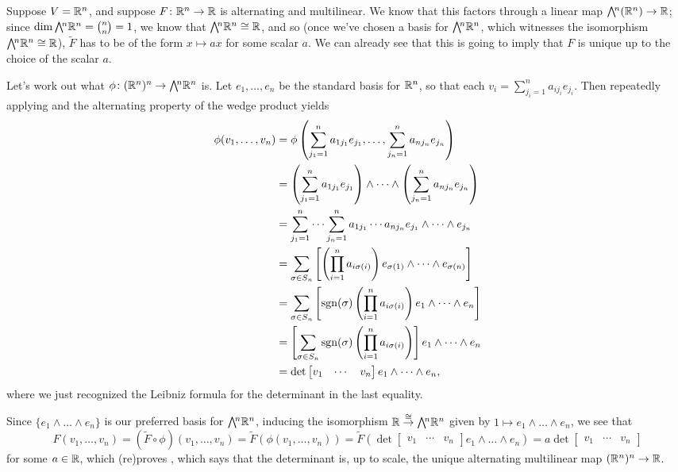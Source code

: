 \begin{example}
	Suppose $V = \mathbb{R}^n$, and suppose $F \colon\thinspace\! \mathbb{R}^n \to \mathbb{R}$ is alternating and multilinear. We know that this factors through a linear map $\ext{n}(\R^n) \to \R$; since $\dim \ext{n}\R^n = \binom{n}{n} = 1$, we know that $\ext{n}\R^n \cong \R$, and so (once we've chosen a basis for $\ext{n}\R^n$, which witnesses the isomorphism $\ext{n}\R^n \cong \R$), $\widetilde{F}$ has to be of the form $x \mapsto ax$ for some scalar $a$. We can already see that this is going to imply that $F$ is unique up to the choice of the scalar $a$.
	
	Let's work out what $\phi \from (\R^n)^n \to \ext{n}\R^n$ is. Let $e_1, \dots , e_n$ be the standard basis for $\mathbb{R}^n$, so that each $v_i = \sum_{j_i=1}^n a_{ij_i} e_{j_i}$. Then repeatedly applying  and the alternating property of the wedge product yields
	\begin{align*}
		\phi(v_1, \dots , v_n) & = \phi\left(\sum_{j_1=1}^n a_{1j_1}e_{j_1}, \dots , \sum_{j_n=1}^n a_{nj_n}e_{j_n}\right)  \\
		& = \left(\sum_{j_1=1}^n a_{1j_1}e_{j_1}\right) \wedge \dots \wedge \left(\sum_{j_n=1}^n a_{nj_n} e_{j_n}\right) \\
		& = \sum_{j_1=1}^n \dots \sum_{j_n=1}^n a_{1j_1} \cdots a_{n j_n} e_{j_1} \wedge \dots \wedge e_{j_n} \\
		& = \sum_{\sigma \in S_n} \left[ \left(\prod_{i=1}^n a_{i \sigma(i)}\right) e_{\sigma(1)} \wedge \dots \wedge e_{\sigma(n)}\right]  \\
		& = \sum_{\sigma \in S_n} \left[ \operatorname{sgn}(\sigma) \left(\prod_{i=1}^n a_{i\sigma(i)}\right) e_1 \wedge \dots \wedge e_n \right] \\
		& = \left[ \sum_{\sigma \in S_n} \operatorname{sgn}(\sigma) \left(\prod_{i=1}^n a_{i\sigma(i)}\right)\right] e_1 \wedge \dots \wedge e_n  \\
		& = \det \begin{bmatrix} v_1 & \cdots & v_n \end{bmatrix} e_1 \wedge \dots \wedge e_n,
	\end{align*}
	where we just recognized the Leibniz formula for the determinant in the last equality.
	
	Since $\{e_1 \wedge \dots \wedge e_n\}$ is our preferred basis for $\ext{n}\R^n$, inducing the isomorphism $\R \overset{\cong}{\to} \ext{n}\R^n$ given by $1 \mapsto e_1 \wedge \dots \wedge e_n$, we see that
	\[
		F(v_1, \dots , v_n) = (\widetilde{F} \circ \phi)(v_1, \dots , v_n) = \widetilde{F}(\phi(v_1, \dots , v_n)) = \widetilde{F}(\det \begin{bmatrix} v_1 & \cdots & v_n \end{bmatrix} e_1 \wedge \dots \wedge e_n) = a \det \begin{bmatrix} v_1 & \cdots & v_n \end{bmatrix}
	\]
	for some $a \in \mathbb{R}$, which (re)proves , which says that the determinant is, up to scale, the unique alternating multilinear map $(\mathbb{R}^n)^n \to \mathbb{R}$.
\end{example}

